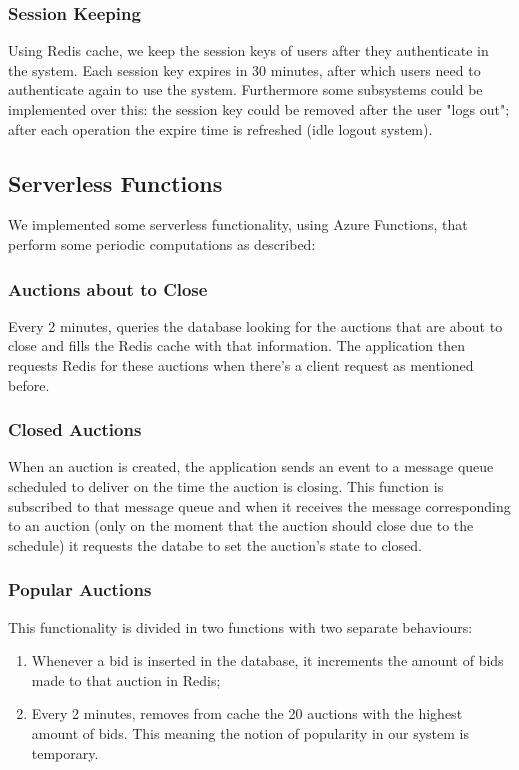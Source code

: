 \documentclass[runningheads]{llncs}
\begin{document}
\subsubsection{Session Keeping}

Using Redis cache, we keep the session keys of users after they authenticate in the system. Each session key expires in 30 minutes, after which users need to authenticate again to use the system. Furthermore some subsystems could be implemented over this: the session key could be removed after the user "logs out"; after each operation the expire time is refreshed (idle logout system).

\subsection{Serverless Functions}

We implemented some serverless functionality, using Azure Functions,  that perform some periodic computations as described: 

\subsubsection{Auctions about to Close}

Every 2 minutes, queries the database looking for the auctions that are about to close and fills the Redis cache with that information. The application then requests Redis for these auctions when there's a client request as mentioned before.

\subsubsection{Closed Auctions}

When an auction is created, the application sends an event to a message queue scheduled to deliver on the time the auction is closing. This function is subscribed to that message queue and when it receives the message corresponding to an auction (only on the moment that the auction should close due to the schedule) it requests the databe to set the auction's state to closed.

\subsubsection{Popular Auctions}

This functionality is divided in two functions with two separate behaviours:
\begin{enumerate}
    \item Whenever a bid is inserted in the database, it increments the amount of bids made to that auction in Redis;
    \item Every 2 minutes, removes from cache the 20 auctions with the highest amount of bids. This meaning the notion of popularity in our system is temporary.
\end{enumerate}
\end{document}

